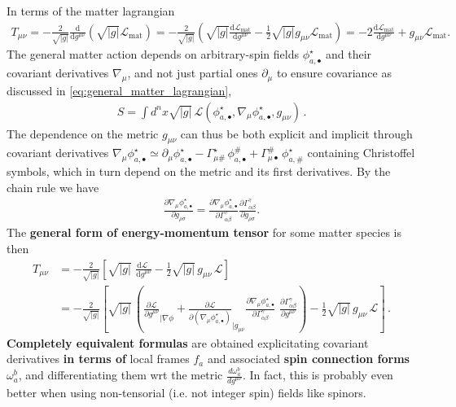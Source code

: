 \documentclass[../geometry_main.tex]{subfiles}
\begin{document}
\begin{mytheorem}
In terms of the matter lagrangian 
{\small
\begin{align}
    T_{\mu\nu} = -\frac{2}{\sqrt{|g|}} \frac{\mathrm{d}}{\mathrm{d} g^{\mu\nu}} \left(\sqrt{|g|} \mathcal{L}_\text{mat}\right)
    = -\frac{2}{\sqrt{|g|}} \left( \sqrt{|g|} \frac{\mathrm{d} \mathcal{L}_\text{mat}}{\mathrm{d} g^{\mu\nu}} -\frac{1}{2}\sqrt{|g|}g_{\mu\nu}\mathcal{L}_\text{mat} \right)
    = -2 \frac{\mathrm{d} \mathcal{L}_\text{mat}}{\mathrm{d} g^{\mu\nu}} + g_{\mu\nu} \mathcal{L}_\text{mat}.
\end{align}
}
The general matter action depends on arbitrary-spin fields $\phi_{a,\bullet}^{\star}$ and their covariant derivatives $\nabla_\mu$, and not just partial ones $\partial_\mu$ to ensure covariance as discussed in \eqref{eq:general_matter_lagrangian},
\begin{align}
    S=\int d^n x \sqrt{|g|} \,\mathcal{L}(\phi_{a,\bullet}^{\star},\nabla_\mu \phi_{a,\bullet}^{\star}, g_{\mu\nu})\,.
\end{align}
The dependence on the metric $g_{\mu\nu}$ can thus be both explicit and implicit through covariant derivatives $\nabla_\mu \phi^\star_{a,\bullet}\simeq \partial_\mu \phi^\star_{a,\bullet} -\Gamma_{\mu \#}^\star \,\phi^{\#}_{a,\bullet} + \Gamma_{\mu\bullet}^{\#}\,\phi^\star_{a,\#}$ containing Christoffel symbols, which in turn depend on the metric and its first derivatives.
By the chain rule we have
\begin{align}
    \frac{\partial \nabla_\mu \phi^\star_{a,\bullet}}{\partial g_{\rho\sigma}}= \frac{\partial \nabla_\mu \phi^\star_{a,\bullet}}{\partial \Gamma_{\alpha\beta}^\gamma} \frac{\partial \Gamma_{\alpha\beta}^\gamma}{\partial g_{\rho\sigma}}.
\end{align}
The \textbf{general form of energy-momentum tensor} for some matter species is then
{\small
\begin{align}
    T_{\mu\nu} &= -\frac{2}{\sqrt{|g|}} \left[ \sqrt{|g|} \,\,\frac{\mathrm{d} \mathcal{L}\,\,}{\mathrm{d} g^{\mu\nu}} -\frac{1}{2}\sqrt{|g|}\,g_{\mu\nu}\,\mathcal{L} \right]
    \\[4pt]
    &= -\frac{2}{\sqrt{|g|}} \left[\sqrt{|g|}\,\left( \frac{\partial \mathcal{L}}{\partial g^{\mu\nu}}_{\mid \nabla \phi} \!\!+\frac{\partial \mathcal{L}}{\partial \left(\nabla_\mu \phi^\star_{a,\bullet}\right)}_{\mid g_{\mu\nu}}\!\!\!\frac{\partial \nabla_\mu \phi^\star_{a,\bullet}}{\partial \Gamma_{\alpha\beta}^\gamma}\,\, \frac{\partial \Gamma_{\alpha\beta}^\gamma}{\partial g^{\mu\nu}}\right) -\frac{1}{2}\sqrt{|g|}\,g_{\mu\nu}\,\mathcal{L} \right]\,.
\end{align}
}
\textbf{Completely equivalent formulas} are obtained explicitating covariant derivatives \textbf{in terms of} local frames $f_a$ and associated \textbf{spin connection forms $\omega_a^b$}, and differentiating them wrt the metric $\frac{d\omega_a^b}{d g^{\mu\nu}}$.
In fact, this is probably even better when using non-tensorial (i.e. not integer spin) fields like spinors.


\end{mytheorem}
\end{document}
